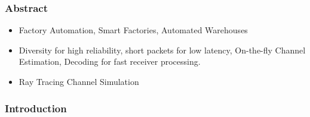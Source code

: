 \documentclass[11pt]{article}
\begin{document}
\subsubsection{Abstract}
\label{sec:orga51f0fe}
\begin{itemize}
\item Factory Automation, Smart Factories, Automated Warehouses
\item Diversity for high reliability, short packets for low latency,  On-the-fly Channel Estimation, Decoding for fast receiver processing.
\item Ray Tracing Channel Simulation
\end{itemize}
\subsubsection{Introduction}
\label{sec:orge9b3249}
\end{document}
